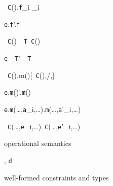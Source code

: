 \begin{figure*}
\begin{minipage}{.4\textwidth}
\quad{}
	{\new~{\tt C}().{\tt f}_i _i}

	{{\tt e}.{\tt f}'.{\tt f}}

	{\new~{\tt C}()~\as~{\tt T}\derives\new~{\tt C}()}

	{{\tt e}~\as~{\tt T}'~\as~{\tt T}}

\end{minipage}%
\begin{minipage}{.6\textwidth}
\quad{}
	{\new~{\tt C}().m()[\new~{\tt C}(),/\this,]}

	{{\tt e}.{\tt m}()'.{\tt m}()}

	{{\tt e}.{\tt m}(\ldots,{\tt a}_i,\ldots).{\tt m}(\ldots,{\tt a}'_i,\ldots)}

	{\new~{\tt C}(\ldots,{\tt e}_i,\ldots)\derives\new~{\tt C}(\ldots,{\tt e}'_i,\ldots)}
\end{minipage}
\caption{\FX{} operational semantics}
\label{fig:sos}
\end{figure*}


\begin{figure*}
\begin{minipage}{.4\textwidth}
\quad{}
\infax[W-True]
  {\cj{}{\true}}

	{}

	{, {\tt d}}

\end{minipage}%
\begin{minipage}{.6\textwidth}
\quad{}

  {}

        {}

	{}
\end{minipage}
\caption{\FX{} well-formed constraints and types}
\label{fig:well}
\end{figure*}


